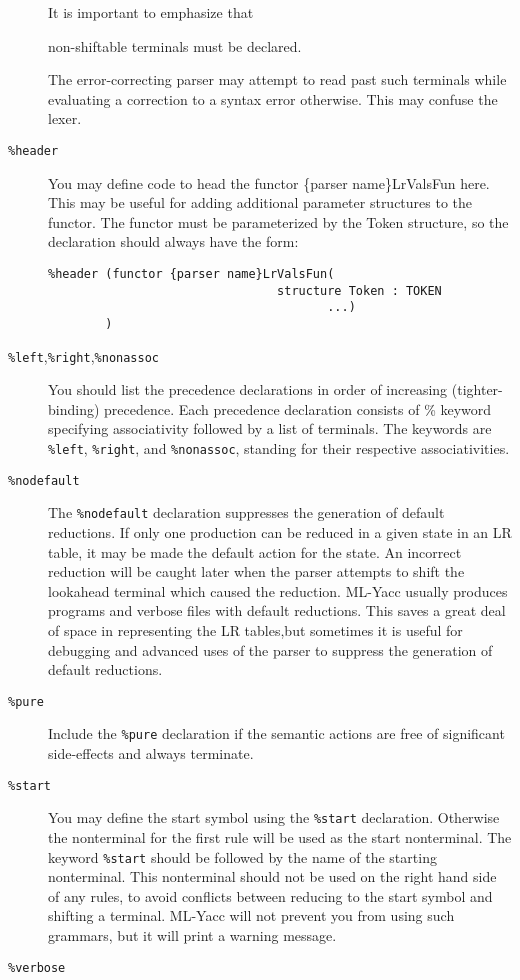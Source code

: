 \documentclass{article}
\begin{document}
\begin{description}
It is important to emphasize that
\begin{em}
non-shiftable terminals must be declared.
\end{em}
The error-correcting parser may attempt to read past such terminals
while evaluating a correction to a syntax error otherwise.  This may
confuse the lexer.
\item[{\tt \%header}]
\begin{samepage}
You may define code to head the functor \{parser name\}LrValsFun here.  This
may be useful for adding additional parameter structures to the functor.
The functor must be parameterized by the Token structure, so
the declaration should always have the form:
\begin{tt}
\begin{verbatim}
%header (functor {parser name}LrValsFun(
                                structure Token : TOKEN
                                       ...) 
        )
\end{verbatim}
\end{tt}
\end{samepage}
\item[{\tt \%left},{\tt \%right},{\tt \%nonassoc}]
You should list the precedence declarations in order of increasing (tighter-binding)
 precedence.  Each precedence declaration consists
of \% keyword specifying associativity followed by a list of terminals.
The keywords are {\tt \%left}, {\tt \%right}, and {\tt \%nonassoc},
standing for their respective associativities.
\item[{\tt \%nodefault}]
The {\tt \%nodefault} declaration suppresses the generation of default
reductions.  If only one production can be reduced in a given state in
an LR table, it may be made the default action for the state.  An incorrect
reduction will be caught later when the parser attempts to shift the lookahead
terminal which caused the reduction. ML-Yacc usually produces programs and
verbose files with default reductions.  This saves a great deal of
space in representing the LR tables,but
sometimes it is useful for debugging and advanced
uses of the parser to suppress the generation of default reductions.
\item[{\tt \%pure}]
Include the {\tt \%pure} declaration if the semantic actions
are free of significant side-effects and always terminate.
\item[{\tt \%start}]
You may define the start symbol using
the {\tt \%start} declaration.  Otherwise the nonterminal for the
first rule will be used as the start nonterminal.
The keyword {\tt \%start} should be followed by the name of the starting
nonterminal.  This nonterminal should not be used on the right hand
side of any rules, to avoid conflicts between reducing to the start
symbol and shifting a terminal.  ML-Yacc will not prevent you
from using such grammars, but it will print a warning message.
\item[{\tt \%verbose}]


\end{description}
\end{document}
